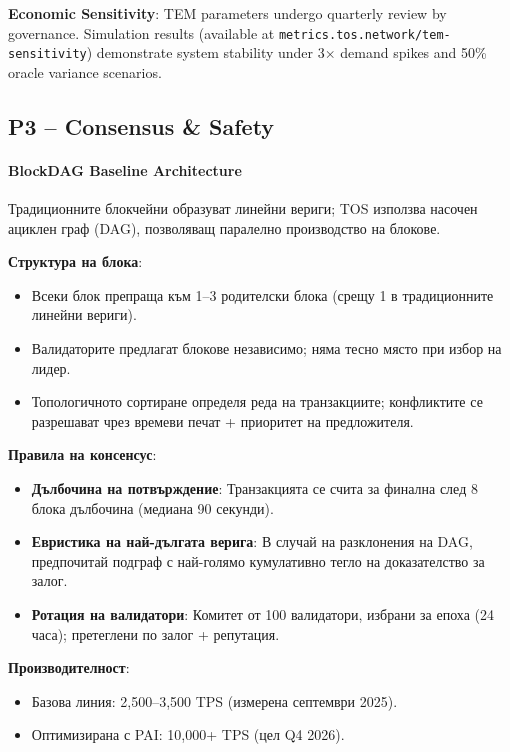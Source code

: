 \documentclass[11pt]{article}
\begin{document}
\textbf{Economic Sensitivity}: TEM parameters undergo quarterly review by governance. Simulation results (available at \texttt{metrics.tos.network/tem-sensitivity}) demonstrate system stability under 3$\times$ demand spikes and 50\% oracle variance scenarios.

\subsection{P3 -- Consensus \& Safety}
\label{sec:pillar-consensus}

\paragraph{BlockDAG Baseline Architecture}
Традиционните блокчейни образуват линейни вериги; TOS използва насочен ациклен граф (DAG), позволяващ паралелно производство на блокове.

\textbf{Структура на блока}:
\begin{itemize}[noitemsep]
  \item Всеки блок препраща към 1--3 родителски блока (срещу 1 в традиционните линейни вериги).
  \item Валидаторите предлагат блокове независимо; няма тесно място при избор на лидер.
  \item Топологичното сортиране определя реда на транзакциите; конфликтите се разрешават чрез времеви печат + приоритет на предложителя.
\end{itemize}

\textbf{Правила на консенсус}:
\begin{itemize}[noitemsep]
  \item \textbf{Дълбочина на потвърждение}: Транзакцията се счита за финална след 8 блока дълбочина (медиана 90 секунди).
  \item \textbf{Евристика на най-дългата верига}: В случай на разклонения на DAG, предпочитай подграф с най-голямо кумулативно тегло на доказателство за залог.
  \item \textbf{Ротация на валидатори}: Комитет от 100 валидатори, избрани за епоха (24 часа); претеглени по залог + репутация.
\end{itemize}

\textbf{Производителност}:
\begin{itemize}[noitemsep]
  \item Базова линия: 2,500--3,500 TPS (измерена септември 2025).
  \item Оптимизирана с PAI: 10,000+ TPS (цел Q4 2026).
\end{itemize}
\end{document}
